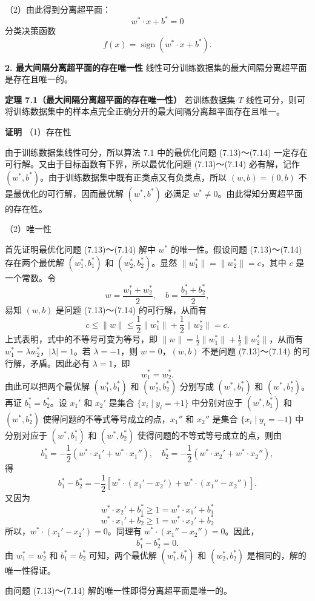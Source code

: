 \documentclass[UTF8, 12pt, fontset=fandol, oneside]{ctexart}
\begin{document}
（2）由此得到分离超平面：
\[
w^*\cdot x+b^*=0
\]
分类决策函数
\[
f(x)=\operatorname{sign}(w^*\cdot x+b^*).
\]

\noindent\textbf{2. 最大间隔分离超平面的存在唯一性}\quad
线性可分训练数据集的最大间隔分离超平面是存在且唯一的。

\noindent\textbf{定理 7.1（最大间隔分离超平面的存在唯一性）}\quad
若训练数据集 $T$ 线性可分，则可将训练数据集中的样本点完全正确分开的最大间隔分离超平面存在且唯一。

\noindent\textbf{证明}\quad
（1）存在性

由于训练数据集线性可分，所以算法 7.1 中的最优化问题 (7.13)～(7.14) 一定存在可行解。又由于目标函数有下界，所以最优化问题 (7.13)～(7.14) 必有解，记作 $(w^*,b^*)$。由于训练数据集中既有正类点又有负类点，所以 $(w,b)=(0,b)$ 不是最优化的可行解，因而最优解 $(w^*,b^*)$ 必满足 $w^*\neq 0$。由此得知分离超平面的存在性。

（2）唯一性

首先证明最优化问题 (7.13)～(7.14) 解中 $w^*$ 的唯一性。假设问题 (7.13)～(7.14) 存在两个最优解 $(w_1^*,b_1^*)$ 和 $(w_2^*,b_2^*)$。显然 $\|w_1^*\|=\|w_2^*\|=c$，其中 $c$ 是一个常数。令
\[
w=\frac{w_1^*+w_2^*}{2},\quad b=\frac{b_1^*+b_2^*}{2},
\]
易知 $(w,b)$ 是问题 (7.13)～(7.14) 的可行解，从而有
\[
c\leq \|w\|\leq \frac{1}{2}\|w_1^*\|+\frac{1}{2}\|w_2^*\|=c.
\]
上式表明，式中的不等号可变为等号，即 $\|w\|=\frac{1}{2}\|w_1^*\|+\frac{1}{2}\|w_2^*\|$，从而有 $w_1^*=\lambda w_2^*$，$|\lambda|=1$。若 $\lambda=-1$，则 $w=0$，$(w,b)$ 不是问题 (7.13)～(7.14) 的可行解，矛盾。因此必有 $\lambda=1$，即
\[
w_1^*=w_2^*.
\]
由此可以把两个最优解 $(w_1^*,b_1^*)$ 和 $(w_2^*,b_2^*)$ 分别写成 $(w^*,b_1^*)$ 和 $(w^*,b_2^*)$。再证 $b_1^*=b_2^*$。设 $x_1'$ 和 $x_2'$ 是集合 $\{x_i\mid y_i=+1\}$ 中分别对应于 $(w^*,b_1^*)$ 和 $(w^*,b_2^*)$ 使得问题的不等式等号成立的点，$x_1''$ 和 $x_2''$ 是集合 $\{x_i\mid y_i=-1\}$ 中分别对应于 $(w^*,b_1^*)$ 和 $(w^*,b_2^*)$ 使得问题的不等式等号成立的点，则由
\[
b_1^*=-\frac{1}{2}(w^*\cdot x_1'+w^*\cdot x_1''),\quad
b_2^*=-\frac{1}{2}(w^*\cdot x_2'+w^*\cdot x_2''),
\]
得
\[
b_1^*-b_2^*=-\frac{1}{2}\left[w^*\cdot(x_1'-x_2')+w^*\cdot(x_1''-x_2'')\right].
\]
又因为
\[
w^*\cdot x_2'+b_1^*\geq 1=w^*\cdot x_1'+b_1^*
\]
\[
w^*\cdot x_1'+b_2^*\geq 1=w^*\cdot x_2'+b_2^*
\]
所以，$w^*\cdot(x_1'-x_2')=0$。同理有 $w^*\cdot(x_1''-x_2'')=0$。因此，
\[
b_1^*-b_2^*=0.
\]
由 $w_1^*=w_2^*$ 和 $b_1^*=b_2^*$ 可知，两个最优解 $(w_1^*,b_1^*)$ 和 $(w_2^*,b_2^*)$ 是相同的，解的唯一性得证。

由问题 (7.13)～(7.14) 解的唯一性即得分离超平面是唯一的。
\end{document}

